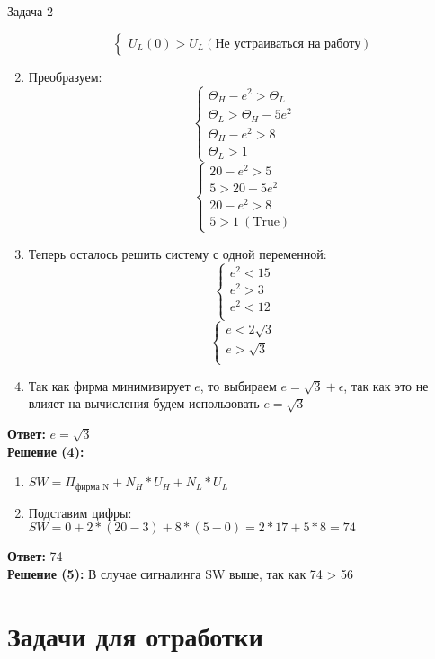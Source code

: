 \begin{mybox}{Задача 2}
\begin{enumerate}
$$\begin{cases}
        U_L(0)>U_L(\text{Не устраиваться на работу})
    \end{cases}$$
    \item Преобразуем: $$\begin{cases}
        \Theta_H-e^2>\Theta_L \\
        \Theta_L>\Theta_H-5e^2 \\
        \Theta_H-e^2>8 \\
        \Theta_L>1
    \end{cases}$$
    $$\begin{cases}
        20-e^2>5 \\
        5>20-5e^2 \\
        20-e^2>8 \\
        5>1 \ (\text{True})
    \end{cases}$$
    \item Теперь осталось решить систему с одной переменной: $$\begin{cases}
        e^2<15 \\
        e^2>3 \\
        e^2<12 \\
    \end{cases}$$
    $$\begin{cases}
        e<2\sqrt{3} \\
        e>\sqrt{3} \\
    \end{cases}$$
    \item Так как фирма минимизирует $e$, то выбираем $e=\sqrt{3}+\epsilon$, так как это не влияет на вычисления будем использовать $e=\sqrt{3}$
\end{enumerate}
\textbf{Ответ:} $e=\sqrt{3}$
\bigskip\\\textbf{Решение (4):}
\begin{enumerate}
    \item $SW=\Pi_{\text{фирма N}}+N_H*U_H+N_L*U_L$
    \item Подставим цифры: $SW=0+2*(20-3)+8*(5-0)=2*17+5*8=74$
\end{enumerate}
\textbf{Ответ:} 74
\bigskip\\\textbf{Решение (5):}
В случае сигналинга SW выше, так как 74 > 56

\end{mybox}

\section{Задачи для отработки}

